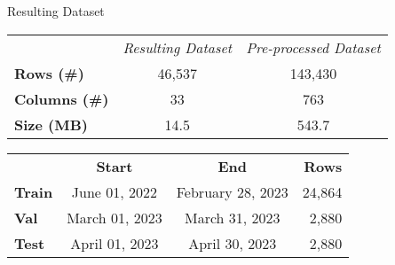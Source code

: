 \begin{frame}{Resulting Dataset}
\begin{table}[]
    \centering
    \begin{tabular}{l|c|c}
        \multicolumn{1}{c}{} & \multicolumn{1}{c}{\textit{Resulting Dataset}} & \multicolumn{1}{c}{\textit{Pre-processed Dataset}} \\
       \textbf{Rows (\#)}     & 46,537 & 143,430\\
       \hline
       \textbf{Columns (\#)}  & 33 & 763\\ 
       \hline
       \textbf{Size (MB)} & 14.5 & 543.7
    \end{tabular}
    \end{table}
    
    \begin{table}[]
    \centering
    \begin{tabular}{l|c|c|r}
         & \textbf{Start} & \textbf{End}& \textbf{Rows}\\
       \textbf{Train}     & June 01, 2022 & February 28, 2023& 24,864\\
       \hline
       \textbf{Val}  & March 01, 2023 & March 31, 2023 &2,880\\ 
       \hline
       \textbf{Test} & April 01, 2023 & April 30, 2023 &2,880
    \end{tabular}
    \end{table}
\end{frame}
